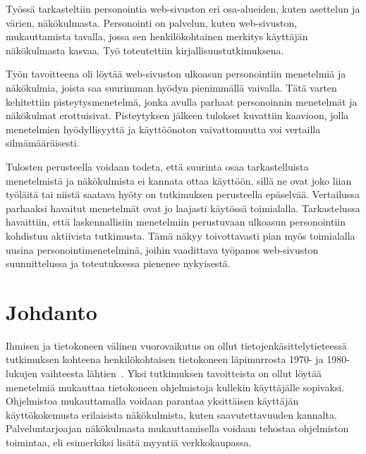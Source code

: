 \documentclass[finnish, 12pt, a4paper, elec, utf8, a-1b, online]{aaltothesis}
\date{29.4.2022}
\begin{document}
\makecoverpage{}

\makecopyrightpage{}

\begin{abstractpage}[finnish]
    Työssä tarkasteltiin personointia web-sivuston eri osa-alueiden, kuten
    asettelun ja värien, näkökulmasta. Personointi on palvelun, kuten
    web-sivuston, mukauttamista tavalla, jossa sen henkilökohtainen merkitys
    käyttäjän näkökulmasta kasvaa. Työ toteutettiin kirjallisuustutkimuksena.

    Työn tavoitteena oli löytää web-sivuston ulkoasun personointiin menetelmiä
    ja näkökulmia, joista saa suurimman hyödyn pienimmällä vaivalla. Tätä varten
    kehitettiin pisteytysmenetelmä, jonka avulla parhaat personoinnin menetelmät
    ja näkökulmat erottuisivat. Pisteytyksen jälkeen tulokset kuvattiin
    kaavioon, jolla menetelmien hyödyllisyyttä ja käyttöönoton vaivattomuutta
    voi vertailla silmämääräisesti.

    Tulosten perusteella voidaan todeta, että suurinta osaa tarkastelluista
    menetelmistä ja näkökulmista ei kannata ottaa käyttöön, sillä ne ovat joko
    liian työläitä tai niistä saatava hyöty on tutkimuksen perusteella
    epäselvää. Vertailussa parhaaksi havaitut menetelmät ovat jo laajasti
    käytössä toimialalla. Tarkastelussa havaittiin, että laskennallisiin
    menetelmiin perustuvaan ulkoasun personointiin kohdistuu aktiivista
    tutkimusta. Tämä näkyy toivottavasti pian myös toimialalla uusina
    personointimenetelminä, joihin vaadittava työpanos web-sivuston
    suunnittelussa ja toteutuksessa pienenee nykyisestä.
\end{abstractpage}

\thesistableofcontents{}

\cleardoublepage{}
\section{Johdanto}

Ihmisen ja tietokoneen välinen vuorovaikutus on ollut tietojenkäsittelytieteessä
tutkimuksen kohteena henkilökohtaisen tietokoneen läpimurrosta 1970- ja
1980-lukujen vaihteesta lähtien~\cite{10.1145/800178.810088}. Yksi tutkimuksen
tavoitteista on ollut löytää menetelmiä mukauttaa tietokoneen ohjelmistoja
kullekin käyttäjälle sopivaksi. Ohjelmistoa mukauttamalla voidaan parantaa
yksittäisen käyttäjän käyttökokemusta erilaisista näkökulmista, kuten
saavutettavuuden kannalta. Palveluntarjoajan näkökulmasta mukauttamisella
voidaan tehostaa ohjelmiston toimintaa, eli esimerkiksi lisätä myyntiä
verkkokaupassa.
\end{document}
